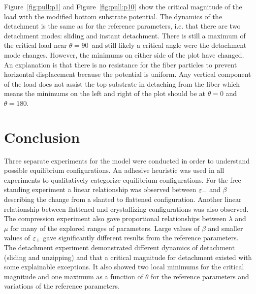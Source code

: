Figure~\ref{fig:pull:p1} and Figure~\ref{fig:pull:p10} show the critical magnitude of the load with the modified bottom substrate potential. The dynamics of the detachment is the same as for the reference parameters, i.e. that there are two detachment modes: sliding and instant detachment. There is still a maximum of the critical load near $\theta=90$\textdegree\ and still likely a critical angle were the detachment mode changes. However, the minimums on either side of the plot have changed. An explanation is that there is no resistance for the fiber particles to prevent horizontal displacement because the potential is uniform. Any vertical component of the load does not assist the top substrate in detaching from the fiber which means the minimums on the left and right of the plot should be at $\theta=0$ and $\theta=180$.

\section{Conclusion}

Three separate experiments for the model were conducted in order to understand possible equilibrium configurations. An adhesive heuristic was used in all experiments to qualitatively categorize equilibrium configurations. For the free-standing experiment a linear relationship was observed between $\varepsilon_-$ and $\beta$ describing the change from a slanted to flattened configuration. Another linear relationship between flattened and crystallizing configurations was also observed. The compression experiment also gave proportional relationships between $\lambda$ and $\mu$ for many of the explored ranges of parameters. Large values of $\beta$ and smaller values of $\varepsilon_+$ gave significantly different results from the reference parameters. The detachment experiment demonstrated different dynamics of detachment (sliding and unzipping) and that a critical magnitude for detachment existed with some explainable exceptions. It also showed two local minimums for the critical magnitude and one maximum as a function of $\theta$ for the reference parameters and variations of the reference parameters.
